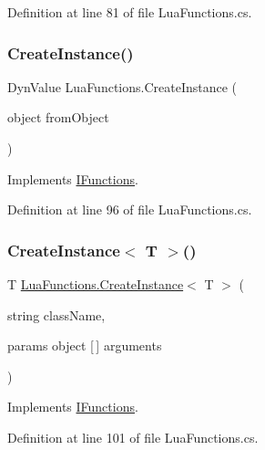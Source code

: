 Definition at line 81 of file Lua\+Functions.\+cs.

\mbox{\label{class_lua_functions_a48e53ec3f02676d03050066fd3555d12}} 
\subsubsection{\texorpdfstring{Create\+Instance()}{CreateInstance()}}
{\footnotesize\ttfamily Dyn\+Value Lua\+Functions.\+Create\+Instance (\begin{DoxyParamCaption}\item[{object}]{from\+Object }\end{DoxyParamCaption})}



Implements \hyperlink{interface_i_functions_a7578bf930745a057a9e24f6048858fe2}{I\+Functions}.



Definition at line 96 of file Lua\+Functions.\+cs.

\mbox{\label{class_lua_functions_a920ae8303f3acff9b271c68889ca7ee5}} 
\subsubsection{\texorpdfstring{Create\+Instance$<$ T $>$()}{CreateInstance< T >()}}
{\footnotesize\ttfamily T \hyperlink{class_lua_functions_a48e53ec3f02676d03050066fd3555d12}{Lua\+Functions.\+Create\+Instance}$<$ T $>$ (\begin{DoxyParamCaption}\item[{string}]{class\+Name,  }\item[{params object \mbox{[}$\,$\mbox{]}}]{arguments }\end{DoxyParamCaption})}



Implements \hyperlink{interface_i_functions_a5acd536d97990a6d5d575dce8bfff5f1}{I\+Functions}.



Definition at line 101 of file Lua\+Functions.\+cs.

\mbox{\label{class_lua_functions_a308710875bcf9a6d4a8513029922a766}} 
